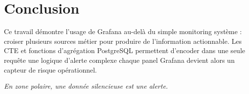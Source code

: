\documentclass[11pt,a4paper]{article}
\begin{document}
\section{Conclusion}

Ce travail démontre l'usage de Grafana au-delà du simple monitoring système : croiser plusieurs sources métier pour produire de l'information actionnable. Les CTE et fonctions d'agrégation PostgreSQL permettent d'encoder dans une seule requête une logique d'alerte complexe \textemdash{} chaque panel Grafana devient alors un capteur de risque opérationnel.

\vspace{0.5cm}
\begin{center}
{\sffamily\itshape\color{midgray}\large
\og En zone polaire, une donnée silencieuse est une alerte. \fg{}}
\end{center}
\end{document}
